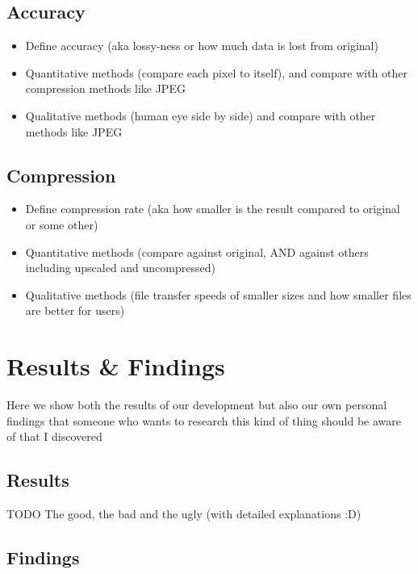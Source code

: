 \documentclass[12pt]{article}
\begin{document}
    \subsection{Accuracy}

    \begin{itemize}
        \item Define accuracy (aka lossy-ness or how much data is lost from original)
        \item Quantitative methods (compare each pixel to itself), and compare with other compression methods like JPEG
        \item Qualitative methods (human eye side by side) and compare with other methods like JPEG
    \end{itemize}

    \subsection{Compression}

    \begin{itemize}
        \item Define compression rate (aka how smaller is the result compared to original or some other)
        \item Quantitative methods (compare against original, AND against others including upscaled and uncompressed)
        \item Qualitative methods (file transfer speeds of smaller sizes and how smaller files are better for users)
    \end{itemize}

    \pagebreak


    \section{Results \& Findings}

    Here we show both the results of our development but also our own personal findings that someone who
    wants to research this kind of thing should be aware of that I discovered

    \subsection{Results}

    TODO
    \linebreak
    The good, the bad and the ugly (with detailed explanations :D)

    \subsection{Findings}
\end{document}
